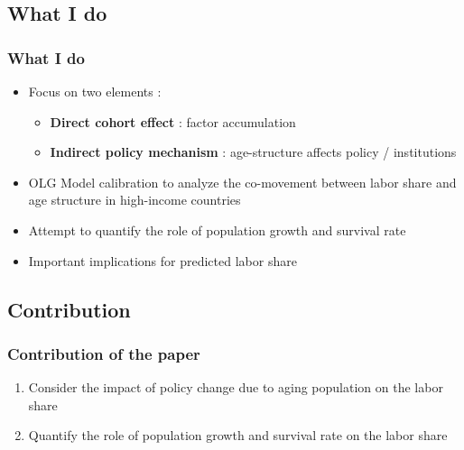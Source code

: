 \documentclass{beamer}
\begin{document}
		\subsection{What I do}
		\begin{frame}\frametitle{What I do}
				\begin{itemize}
					\item Focus on two elements :
					\begin{itemize}
						\item \textbf{Direct cohort effect} : factor accumulation
						\item \textbf{Indirect policy mechanism} : age-structure affects policy / institutions
					\end{itemize}
					\vspace{1em}
					\item OLG Model calibration to analyze the co-movement between labor share and age structure in high-income countries
					\vspace{1em}
					\item Attempt to quantify the role of population growth and survival rate
					\item Important implications for predicted labor share
				\end{itemize}
			\end{frame}
		\subsection{Contribution}
		\begin{frame}\frametitle{Contribution of the paper}
			\begin{enumerate}
				[default]
				\item Consider the impact of policy change due to aging population on the labor share
				\vspace{1em}
				\item Quantify the role of population growth and survival rate on the labor share
			\end{enumerate}
		\end{frame}
	
\end{document}
